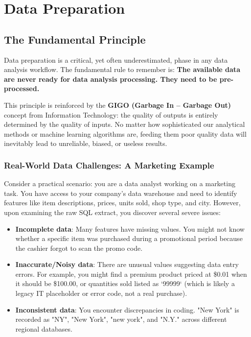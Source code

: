 \section{Data Preparation}

\subsection{The Fundamental Principle}

Data preparation is a critical, yet often underestimated, phase in any data analysis workflow. The fundamental rule to remember is: \textbf{The available data are never ready for data analysis processing. They need to be pre-processed.}

This principle is reinforced by the \textbf{GIGO (Garbage In -- Garbage Out)} concept from Information Technology: the quality of outputs is entirely determined by the quality of inputs. No matter how sophisticated our analytical methods or machine learning algorithms are, feeding them poor quality data will inevitably lead to unreliable, biased, or useless results.

\subsubsection{Real-World Data Challenges: A Marketing Example}

Consider a practical scenario: you are a data analyst working on a marketing task. You have access to your company's data warehouse and need to identify features like item descriptions, prices, units sold, shop type, and city. However, upon examining the raw SQL extract, you discover several severe issues:

\begin{itemize}
    \item \textbf{Incomplete data}: Many features have missing values. You might not know whether a specific item was purchased during a promotional period because the cashier forgot to scan the promo code.
    
    \item \textbf{Inaccurate/Noisy data}: There are unusual values suggesting data entry errors. For example, you might find a premium product priced at \$0.01 when it should be \$100.00, or quantities sold listed as `99999` (which is likely a legacy IT placeholder or error code, not a real purchase).
    
    \item \textbf{Inconsistent data}: You encounter discrepancies in coding. "New York" is recorded as "NY", "New York", "new york", and "N.Y." across different regional databases.
\end{itemize}

